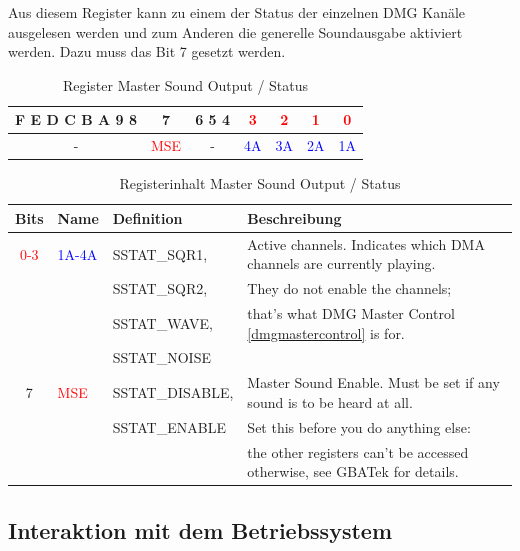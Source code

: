 \documentclass[11pt,a4paper]{scrartcl}
\begin{document}
Aus diesem Register kann zu einem der Status der einzelnen DMG Kan\"ale ausgelesen werden und zum Anderen die generelle Soundausgabe aktiviert werden. Dazu muss das Bit 7 gesetzt werden.
	
\begin{table}[h]
	\centering
	\begin{tabular}{| c | c | c | c | c | c | c |}
	    \hline
	    F E D C B A 9 8 & 7 & 6 5 4 & \textcolor{red}{3} & \textcolor{red}{2} & \textcolor{red}{1} & \textcolor{red}{0} \\
	    \hline
	- & \textcolor{red}{MSE} & - & \textcolor{blue}{4A} & \textcolor{blue}{3A} & \textcolor{blue}{2A} & \textcolor{blue}{1A} \\
	    \hline
	\end{tabular}
	\caption{Register Master Sound Output / Status}
	\label{table: MasterSoundOutputStatus}
\end{table}
	
\begin{table}[h]
	\centering
	\begin{tabular}{| c | l | l | l |}
	    \hline
	    \textbf{Bits} & \textbf{Name} & \textbf{Definition} & \textbf{Beschreibung} \\
	    \hline
	    \textcolor{red}{0-3} & \textcolor{blue}{1A-4A} & SSTAT\_SQR1, & Active channels. Indicates which DMA channels are currently playing.   \\
	    & & SSTAT\_SQR2, & They do not enable the channels;\\
	    & & SSTAT\_WAVE, & that's what DMG Master Control \ref{dmgmastercontrol} is for.\\
	    & & SSTAT\_NOISE & \\
	    \hline
	    7 & \textcolor{red}{MSE} & SSTAT\_DISABLE, & Master Sound Enable. Must be set if any sound is to be heard at all.   \\
	    & & SSTAT\_ENABLE & Set this before you do anything else: \\
	    & & & the other registers can't be accessed otherwise, see GBATek for details. \\ 
	    \hline
	\end{tabular}
	\caption{Registerinhalt Master Sound Output / Status}
	\label{table: MasterSoundOutputStatusContent}
\end{table}

\clearpage

\subsection{Interaktion mit dem Betriebssystem}
\end{document}
